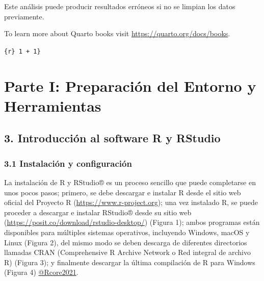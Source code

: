 \documentclass[
  letterpaper,
  DIV=11,
  numbers=noendperiod]{scrreprt}
\begin{document}
\begin{tcolorbox}[enhanced jigsaw, toptitle=1mm, colbacktitle=quarto-callout-warning-color!10!white, breakable, opacityback=0, toprule=.15mm, coltitle=black, colframe=quarto-callout-warning-color-frame, bottomtitle=1mm, bottomrule=.15mm, titlerule=0mm, title=\textcolor{quarto-callout-warning-color}{\faExclamationTriangle}\hspace{0.5em}{Cuidado}, colback=white, arc=.35mm, rightrule=.15mm, leftrule=.75mm, left=2mm, opacitybacktitle=0.6]

Este análisis puede producir resultados erróneos si no se limpian los
datos previamente.

\end{tcolorbox}

To learn more about Quarto books visit
\url{https://quarto.org/docs/books}.

\texttt{\{r\}\ 1\ +\ 1\}}


\chapter{Parte I: Preparación del Entorno y
Herramientas}\label{parte-i-preparaciuxf3n-del-entorno-y-herramientas}

\section{3. Introducción al software R y
RStudio}\label{introducciuxf3n-al-software-r-y-rstudio}

\subsection{3.1 Instalación y
configuración}\label{instalaciuxf3n-y-configuraciuxf3n}

La instalación de R y RStudio® es un proceso sencillo que puede
completarse en unos pocos pasos; primero, se debe descargar e instalar R
desde el sitio web oficial del Proyecto R
(\url{https://www.r-project.org}); una vez instalado R, se puede
proceder a descargar e instalar RStudio® desde su sitio web
(\url{https://posit.co/download/rstudio-desktop/}) (Figura 1); ambos
programas están disponibles para múltiples sistemas operativos,
incluyendo Windows, macOS y Linux (Figura 2), del mismo modo se deben
descarga de diferentes directorios llamadas CRAN (Comprehensive R
Archive Network o Red integral de archivo R) (Figura 3); y finalmente
descargar la última compilación de R para Windows (Figura 4)
\href{R\%20Core\%20Team,\%202023}{@Rcore2021}.
\end{document}
